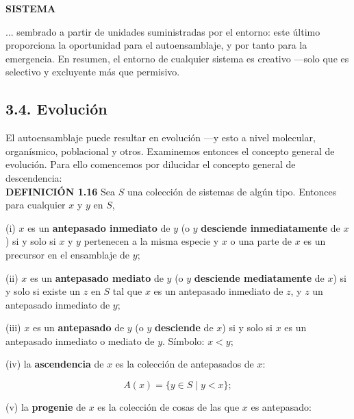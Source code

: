 \newpage
\fancyhf{}
\fancyhead[r]{\thepage}
\begin{center}
{\fontsize{16}{18}\selectfont \textbf{SISTEMA}}
\end{center}
\vspace{0.5cm}

{\fontsize{13}{15}\selectfont
... sembrado a partir de unidades suministradas por el entorno: este último proporciona la oportunidad para el autoensamblaje, y por tanto para la emergencia. En resumen, el entorno de cualquier sistema es creativo —solo que es selectivo y excluyente más que permisivo.

\subsection*{3.4. Evolución}

El autoensamblaje puede resultar en evolución —y esto a nivel molecular, organísmico, poblacional y otros. 
Examinemos entonces el concepto general de evolución. Para ello comencemos por dilucidar el concepto general de descendencia: \\

\textbf{DEFINICIÓN 1.16} Sea \( S \) una colección de sistemas de algún tipo. Entonces para cualquier \( x \) y \( y \) en \( S \),

(i) \( x \) es un \textbf{antepasado inmediato} de \( y \) (o \( y \) \textbf{desciende inmediatamente} de \( x \)) si y solo si \( x \) y \( y \) pertenecen a la misma especie y \( x \) o una parte de \( x \) es un precursor en el ensamblaje de \( y \);

(ii) \( x \) es un \textbf{antepasado mediato} de \( y \) (o \( y \) \textbf{desciende mediatamente} de \( x \)) si y solo si existe un \( z \) en \( S \) tal que \( x \) es un antepasado inmediato de \( z \), y \( z \) un antepasado inmediato de \( y \);

(iii) \( x \) es un \textbf{antepasado} de \( y \) (o \( y \) \textbf{desciende} de \( x \)) si y solo si \( x \) es un antepasado inmediato o mediato de \( y \). Símbolo: \( x < y \);

(iv) la \textbf{ascendencia} de \( x \) es la colección de antepasados de \( x \):

\[A(x) = \{y \in S \mid y < x\};\]

(v) la \textbf{progenie} de \( x \) es la colección de cosas de las que \( x \) es antepasado:

}
